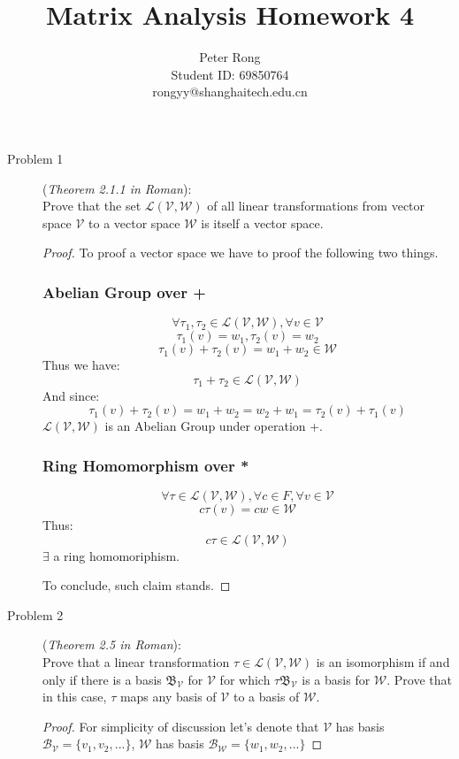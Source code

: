 \documentclass{article}
\title{Matrix Analysis Homework 4}
\author{Peter Rong \\ Student ID: 69850764 \\ rongyy@shanghaitech.edu.cn}
\begin{document}
\maketitle

\begin{description}
	\item[Problem 1] (\textit{Theorem 2.1.1 in Roman}):\\
	Prove that the set $\mathcal{L}(\mathcal{V},\mathcal{W})$ of all linear transformations from vector space $\mathcal{V}$ to a vector space $\mathcal{W}$ is itself a vector space.\\
	\begin{proof}
		To proof a vector space we have to proof the following two things.
		\subsubsection*{Abelian Group over +}
			$$\forall \tau_1, \tau_2 \in \mathcal{L}(\mathcal{V}, \mathcal{W}), \forall v \in \mathcal{V}$$
			$$ \tau_1(v) = w_1, \tau_2(v) = w_2$$
			$$ \tau_1(v) + \tau_2(v) = w_1 + w_2 \in \mathcal{W}$$
			Thus we have: 
			$$ \tau_1+\tau_2 \in \mathcal{L}(\mathcal{V}, \mathcal{W})$$
			And since:
			$$ \tau_1(v) + \tau_2(v) = w_1 + w_2 = w_2 + w_1 = \tau_2(v) + \tau_1(v) $$
			$\mathcal{L}(\mathcal{V}, \mathcal{W})$ is an Abelian Group under operation +.
		\subsubsection*{Ring Homomorphism over *}
			$$\forall \tau \in \mathcal{L}(\mathcal{V}, \mathcal{W}), \forall c \in F, \forall v \in \mathcal{V}$$
			$$c\tau(v) = cw \in \mathcal{W}$$
			Thus: $$c\tau \in \mathcal{L}(\mathcal{V}, \mathcal{W})$$
			$\exists$ a ring homomoriphism.
		\par To conclude, such claim stands.
	\end{proof}

	\item[Problem 2] (\textit{Theorem 2.5 in Roman}):\\
	Prove that a linear transformation $\tau \in \mathcal{L}(\mathcal{V},\mathcal{W})$ is an isomorphism if and only if there is a basis $\mathfrak{B}_\mathcal{V}$ for $\mathcal{V}$ for which $\tau\mathfrak{B}_\mathcal{V}$ is a basis for $\mathcal{W}$. Prove that in this case, $\tau$ maps any basis of $\mathcal{V}$ to a basis of $\mathcal{W}$.\\
	\begin{proof}
		For simplicity of discussion let's denote that $\mathcal{V}$ has basis $\mathcal{B_V} = \{v_1, v_2, ...\}$, $\mathcal{W}$ has basis $\mathcal{B_W} = \{w_1, w_2, ...\}$

\end{proof}
\end{description}
\end{document}
